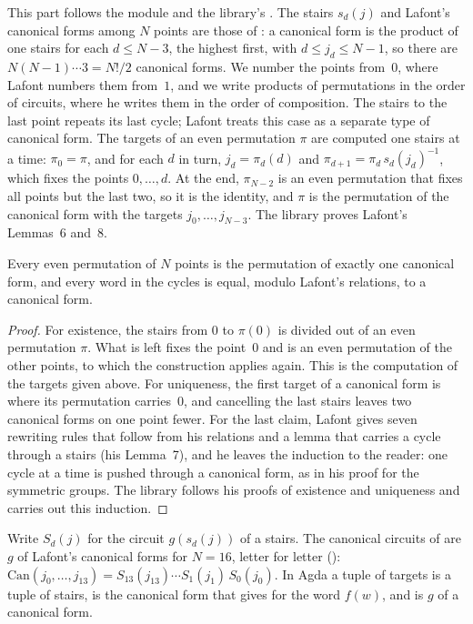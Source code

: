 \documentclass[acmsmall,screen,nonacm]{acmart}
\begin{document}
This part follows the module  and the library's . The stairs $s_d(j)$ and Lafont's canonical forms among $N$ points are those of : a canonical form is the product of one stairs for each $d\le N-3$, the highest first, with $d\le j_d\le N-1$, so there are $N(N-1)\cdots3=N!/2$ canonical forms. We number the points from~$0$, where Lafont numbers them from~$1$, and we write products of permutations in the order of circuits, where he writes them in the order of composition. The stairs to the last point repeats its last cycle; Lafont treats this case as a separate type of canonical form. The targets of an even permutation $\pi$ are computed one stairs at a time: $\pi_0=\pi$, and for each $d$ in turn, $j_d=\pi_d(d)$ and $\pi_{d+1}=\pi_d\,s_d(j_d)^{-1}$, which fixes the points $0,\dots,d$. At the end, $\pi_{N-2}$ is an even permutation that fixes all points but the last two, so it is the identity, and $\pi$ is the permutation of the canonical form with the targets $j_0,\dots,j_{N-3}$. The library proves Lafont's Lemmas~6 and~8.

\begin{lemma}\label{lem:x-lafont}
Every even permutation of $N$ points is the permutation of exactly one canonical form, and every word in the cycles is equal, modulo Lafont's relations, to a canonical form.
\end{lemma}

\begin{proof}
For existence, the stairs from $0$ to $\pi(0)$ is divided out of an even permutation $\pi$. What is left fixes the point~$0$ and is an even permutation of the other points, to which the construction applies again. This is the computation of the targets given above. For uniqueness, the first target of a canonical form is where its permutation carries~$0$, and cancelling the last stairs leaves two canonical forms on one point fewer. For the last claim, Lafont gives seven rewriting rules that follow from his relations and a lemma that carries a cycle through a stairs (his Lemma~7), and he leaves the induction to the reader: one cycle at a time is pushed through a canonical form, as in his proof for the symmetric groups. The library follows his proofs of existence and uniqueness and carries out this induction.
\end{proof}

Write $S_d(j)$ for the circuit $g(s_d(j))$ of a stairs. The canonical circuits of  are $g$ of Lafont's canonical forms for $N=16$, letter for letter \textup{()}: $\mathrm{Can}(j_0,\dots,j_{13})=S_{13}(j_{13})\cdots S_1(j_1)\,S_0(j_0)$. In Agda a tuple of targets is a tuple of stairs,  is the canonical form that  gives for the word $f(w)$, and  is $g$ of a canonical form.
\end{document}
